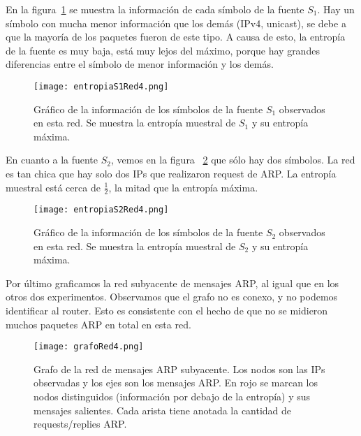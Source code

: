 En la figura~\ref{entropias1_4} se muestra la información de cada símbolo de la fuente $S_1$. Hay un símbolo con mucha menor información que los demás (IPv4, unicast), se debe a que la mayoría de los paquetes fueron de este tipo. A causa de esto, la entropía de la fuente es muy baja, está muy lejos del máximo, porque hay grandes diferencias entre el símbolo de menor información y los demás.

\begin{figure}[H]
\centering
\texttt{[image: entropiaS1Red4.png]}
\caption{Gráfico de la información de los símbolos de la fuente $S_1$ observados en esta red. Se muestra la entropía muestral de $S_1$ y su entropía máxima.}
\label{entropias1_4}
\end{figure}

En cuanto a la fuente $S_2$, vemos en la figura ~\ref{entropias2_4} que sólo hay dos símbolos. La red es tan chica que hay solo dos IPs que realizaron request de ARP. La entropía muestral está cerca de $\frac{1}{2}$, la mitad que la entropía máxima.

\begin{figure}[H]
\centering
\texttt{[image: entropiaS2Red4.png]}
\caption{Gráfico de la información de los símbolos de la fuente $S_2$ observados en esta red. Se muestra la entropía muestral de $S_2$ y su entropía máxima.}
\label{entropias2_4}
\end{figure}

Por último graficamos la red subyacente de mensajes ARP, al igual que en los otros dos experimentos. Observamos que el grafo no es conexo, y no podemos identificar al router. Esto es consistente con el hecho de que no se midieron muchos paquetes ARP en total en esta red.

\begin{figure}[H]
\centering
\texttt{[image: grafoRed4.png]}
\caption{Grafo de la red de mensajes ARP subyacente. Los nodos son las IPs observadas y los ejes son los mensajes ARP. En rojo se marcan los nodos distinguidos (información por debajo de la entropía) y sus mensajes salientes. Cada arista tiene anotada la cantidad de requests/replies ARP.}
\label{grafo4}
\end{figure}
